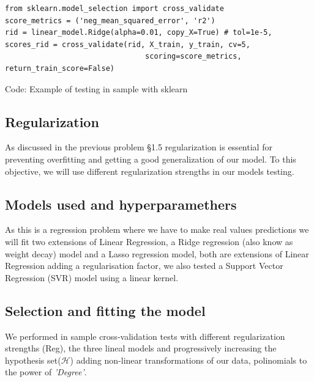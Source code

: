 \documentclass{article}
\begin{document}
\begin{verbatim}
from sklearn.model_selection import cross_validate
score_metrics = ('neg_mean_squared_error', 'r2') 
rid = linear_model.Ridge(alpha=0.01, copy_X=True) # tol=1e-5,
scores_rid = cross_validate(rid, X_train, y_train, cv=5, 
                                scoring=score_metrics, return_train_score=False)
\end{verbatim}
\begin{center}
    {\footnotesize Code: Example of testing in sample with sklearn}
\end{center}

\subsection{Regularization}
As discussed in the previous problem \S 1.5 regularization is essential for preventing overfitting and getting a good generalization of our model. To this objective, we will use different regularization strengths in our models testing.

\subsection{Models used and hyperparamethers}
As this is a regression problem where we have to make real values predictions we will fit two extensions of Linear Regression, a Ridge regression (also know as weight decay) model and a Lasso regression model, both are extensions of Linear Regression adding a regularisation factor, we also tested a Support Vector Regression (SVR) model using a linear kernel.


\subsection{Selection and fitting the model}
We performed in sample cross-validation tests with different regularization strengths (Reg), the three lineal models and progressively increasing the hypothesis set($\mathcal{H}$) adding non-linear transformations of our data, polinomials to the power of \textit{'Degree'}.
\end{document}

